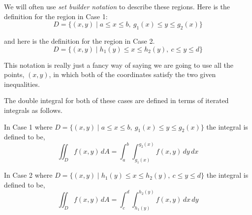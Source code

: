 \begin{center}
\end{center}

\vspace{0.5em}

We will often use \emph{set builder notation} to describe these regions. Here is
the definition for the region in Case 1:
\[
D=\{(x,y)\mid a\le x\le b,\ g_1(x)\le y\le g_2(x)\}
\]

and here is the definition for the region in Case 2.
\[
D=\{(x,y)\mid h_1(y)\le x\le h_2(y),\ c\le y\le d\}
\]

This notation is really just a fancy way of saying we are going to use all the
points, \((x,y)\), in which both of the coordinates satisfy the two given
inequalities.

The double integral for both of these cases are defined in terms of iterated
integrals as follows.

In Case 1 where \(D=\{(x,y)\mid a\le x\le b,\ g_1(x)\le y\le g_2(x)\}\) the
integral is defined to be,
\[
\iint_D f(x,y)\,dA
=
\int_a^b \int_{g_1(x)}^{g_2(x)} f(x,y)\,dy\,dx
\]

In Case 2 where \(D=\{(x,y)\mid h_1(y)\le x\le h_2(y),\ c\le y\le d\}\) the
integral is defined to be,
\[
\iint_D f(x,y)\,dA
=
\int_c^d \int_{h_1(y)}^{h_2(y)} f(x,y)\,dx\,dy
\]




